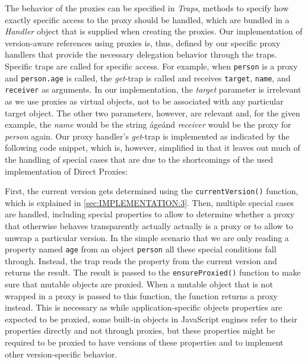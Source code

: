 The behavior of the proxies can be specified in \emph{Traps}, methods to specify how exactly specific access to the proxy should be handled, which are bundled in a \emph{Handler} object that is supplied when creating the proxies.
Our implementation of version-aware references using proxies is, thus, defined by our specific proxy handlers that provide the necessary delegation behavior through the traps.
Specific traps are called for specific access. 
For example, when \lstinline{person} is a proxy and \lstinline{person.age} is called, the \emph{get}-trap is called and receives \lstinline{target}, \lstinline{name}, and \lstinline{receiver} as arguments.
In our implementation, the \emph{target} parameter is irrelevant as we use proxies as virtual objects, not to be associated with any particular target object.
The other two parameters, however, are relevant and, for the given example, the \emph{name} would be the string \'age\' and \emph{receiver} would be the proxy for \emph{person} again.
Our proxy handler's \emph{get}-trap is implemented as indicated by the following code snippet, which is, however, simplified in that it leaves out much of the handling of special cases that are due to the shortcomings of the used implementation of Direct Proxies:

\iffalse
\begin{verbatim}\fi
\begin{code}{}{}
get: function(dummyTarget, name, receiver) {

    var version = this.currentVersion();
    
    // proxy meta information and other special cases..
    if (name === 'isProxy') {
    // ...
    if (name === 'proxyTarget') {
    // ...
    
    result = version[name];
    
    return this.ensureProxied(result);
}
\end{code}
\iffalse
\end{verbatim}\fi

First, the current version gets determined using the \lstinline{currentVersion()} function, which is explained in \ref{sec:IMPLEMENTATION:3}.
Then, multiple special cases are handled, including special properties to allow to determine whether a proxy that otherwise behaves transparently actually actually is a proxy or to allow to unwrap a particular version.
In the simple scenario that we are only reading a property named \lstinline{age} from an object \lstinline{person} all these special conditions fall through.
Instead, the trap reads the property from the current version and returns the result.
The result is passed to the \lstinline{ensureProxied()} function to make sure that mutable objects are proxied.
When a mutable object that is not wrapped in a proxy is passed to this function, the function returns a proxy instead.
This is necessary as while application-specific objects properties are expected to be proxied, some built-in objects in JavaScript engines refer to their properties directly and not through proxies, but these properties might be required to be proxied to have versions of these properties and to implement other version-specific behavior.

